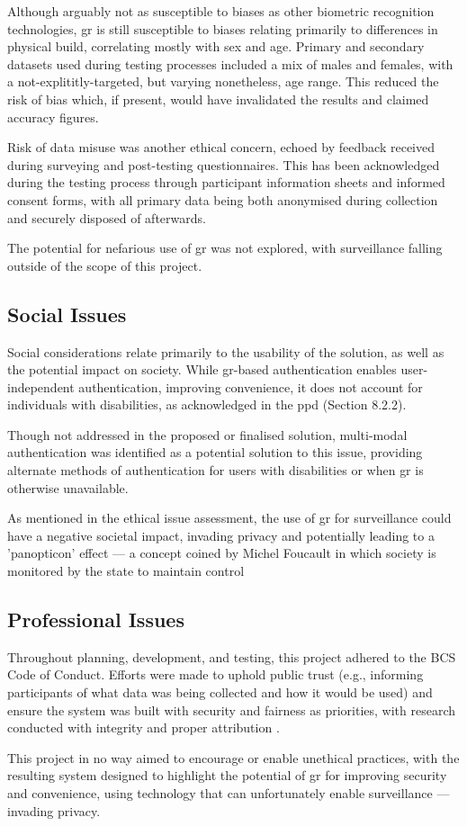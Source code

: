 Although arguably not as susceptible to biases as other biometric recognition technologies, \ac{gr} is still susceptible to biases relating primarily to differences in physical build, correlating mostly with sex and age.
Primary and secondary datasets used during testing processes included a mix of males and females, with a not-explititly-targeted, but varying nonetheless, age range.
This reduced the risk of bias which, if present, would have invalidated the results and claimed accuracy figures.

Risk of data misuse was another ethical concern, echoed by feedback received during surveying and post-testing questionnaires.
This has been acknowledged during the testing process through participant information sheets and informed consent forms, with all primary data being both anonymised during collection and securely disposed of afterwards.

The potential for nefarious use of \ac{gr} was not explored, with surveillance falling outside of the scope of this project. 

\subsection{Social Issues}

Social considerations relate primarily to the usability of the solution, as well as the potential impact on society.
While \ac{gr}-based authentication enables user-independent authentication, improving convenience, it does not account for individuals with disabilities, as acknowledged in the \ac{ppd} (Section 8.2.2).

Though not addressed in the proposed or finalised solution, multi-modal authentication was identified as a potential solution to this issue, providing alternate methods of authentication for users with disabilities or when \ac{gr} is otherwise unavailable.

As mentioned in the ethical issue assessment, the use of \ac{gr} for surveillance could have a negative societal impact, invading privacy and potentially leading to a 'panopticon' effect --- a concept coined by Michel Foucault in which society is monitored by the state to maintain control \parencite{foucaultm.DisciplinePunishBirth1977}

\subsection{Professional Issues}

Throughout planning, development, and testing, this project adhered to the BCS Code of Conduct. 
Efforts were made to uphold public trust (e.g., informing participants of what data was being collected and how it would be used) and ensure the system was built with security and fairness as priorities, with research conducted with integrity and proper attribution \parencite{bcsBCSCodeConduct2024}.

This project in no way aimed to encourage or enable unethical practices, with the resulting system designed to highlight the potential of \ac{gr} for improving security and convenience, using technology that can unfortunately enable surveillance --- invading privacy.

